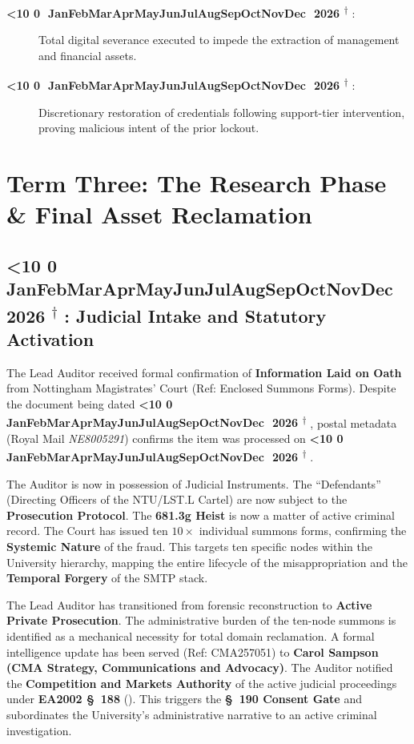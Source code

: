 \documentclass{EMBASSY}
\DeclareRobustCommand{\gmt}[3]{%
    \texorpdfstring{%
        {\color{DateGold}\textbf{%
            \ifnum#1<10 0\fi#1\,\textperiodcentered\,%
            \ifcase#2\or Jan\or Feb\or Mar\or Apr\or May\or Jun\or Jul\or Aug\or Sep\or Oct\or Nov\or Dec\fi
            \,\textperiodcentered\,20#3%
            \textsuperscript{$\dagger$}%
        }}%
    }{%
        (#1/#2/#3)%
    }%
}
\begin{document}
\begin{description}
	\item[\gmt{7}{4}{26}:] Total digital severance executed to impede the extraction of management and financial assets.
	\item[\gmt{10}{4}{26}:] Discretionary restoration of credentials following support-tier intervention, proving malicious intent of the prior lockout.
\end{description}

\section{Term Three: The Research Phase \& Final Asset Reclamation}

\subsection{\gmt{14}{4}{26}: Judicial Intake and Statutory Activation}
The Lead Auditor received formal confirmation of \textbf{Information Laid on Oath} from Nottingham Magistrates' Court (Ref: Enclosed Summons Forms). Despite the document being dated \gmt{9}{4}{26}, postal metadata (Royal Mail \textit{NE8005291}) confirms the item was processed on \gmt{13}{4}{26}.

The Auditor is now in possession of Judicial Instruments. The ``Defendants'' (Directing Officers of the NTU/LST.L Cartel) are now subject to the \textbf{Prosecution Protocol}. The \textbf{681.3g Heist} is now a matter of active criminal record. The Court has issued ten $10 \times$ individual summons forms, confirming the \textbf{Systemic Nature} of the fraud. This targets ten specific nodes within the University hierarchy, mapping the entire lifecycle of the misappropriation and the \textbf{Temporal Forgery} of the SMTP stack.

The Lead Auditor has transitioned from forensic reconstruction to \textbf{Active Private Prosecution}. The administrative burden of the ten-node summons is identified as a mechanical necessity for total domain reclamation. A formal intelligence update has been served (Ref: CMA257051) to \textbf{Carol Sampson (CMA Strategy, Communications and Advocacy)}. The Auditor notified the \textbf{Competition and Markets Authority} of the active judicial proceedings under \textbf{EA2002 \S~188} (\cite{EA2002}). This triggers the \textbf{\S~190 Consent Gate} and subordinates the University's administrative narrative to an active criminal investigation.
\end{document}
